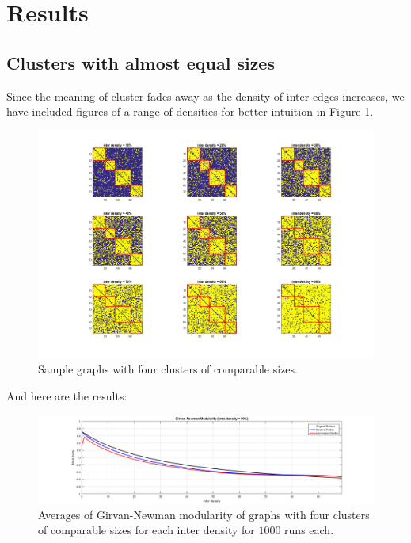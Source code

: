 \documentclass{amsart}
\begin{document}
\newpage	
	\section{Results}
	
		\subsection{Clusters with almost equal sizes}
			Since the meaning of cluster fades away as the density of inter edges increases, we have included figures of a range of densities for better intuition in Figure \ref{four_comparable_clusters_samples}.
			
			\begin{figure}[h]
			\begin{center}
				\includegraphics[width = \linewidth, trim = 150 70 150 30, clip]{four_comparable_clusters_samples}
				\caption{Sample graphs with four clusters of comparable sizes.}
				\label{four_comparable_clusters_samples}
			\end{center}
			\end{figure}
			
			And here are the results:
			
			\begin{figure}[h]
			\begin{center}
				\includegraphics[width = \linewidth, trim = 70 0 70 10, clip]{four_comparable_clusters_modularity}
				\caption{Averages of Girvan-Newman modularity of graphs with four clusters of comparable sizes for each inter density for $1000$ runs each.}
				\label{four_comparable_clusters_GNM}
			\end{center}
			\end{figure}
		
\end{document}
